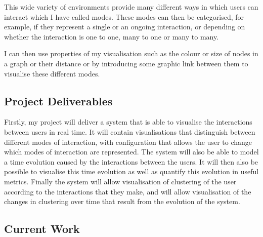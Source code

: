 \documentclass[12pt,a4paper]{article}
\begin{document}
This wide variety of environments provide many different ways in which users can interact which I have called modes. These modes can then be categorised, for example, if they represent a single or an ongoing interaction, or depending on whether the interaction is one to one, many to one or many to many.

I can then use properties of my visualisation such as the colour or size of nodes in a graph or their distance or by introducing some graphic link between them to visualise these different modes.

\subsection{Project Deliverables}
Firstly, my project will deliver a system that is able to visualise the interactions between users in real time. It will contain visualisations that distinguish between different modes of interaction, with configuration that allows the user to change which modes of interaction are represented. The system will also be able to model a time evolution caused by the interactions between the users. It will then also be possible to visualise this time evolution as well as quantify this evolution in useful metrics. Finally the system will allow visualisation of clustering of the user according to the interactions that they make, and will allow visualisation of the changes in clustering over time that result from the evolution of the system.

\subsection{Current Work}
\end{document}
